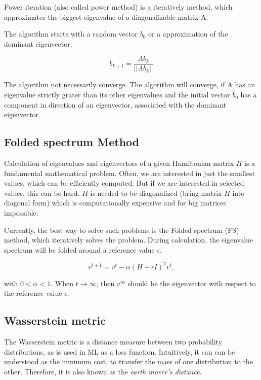 Power iteration (also called power method) is a iteratively method, 
which approximates the biggest eigenvalue of a diagonalizable matrix A.

The algorithm starts with a random vector $b_0$ or a approximation of the dominant eigenvector.

\begin{equation}
    \label{eq:powerIterations}
    b_{k+1} = \frac{Ab_k}{||Ab_k||}
\end{equation}

The algorithm not necessarily converge. The algorithm will converge, if A has an eigenvalue strictly grater than its other eigenvalues
and the initial vector $b_0$ has a component in direction of an eigenvector, associated with the dominant eigenvector.

\subsection{Folded spectrum Method}
\label{sec:FoldedSpectrumMethod}
Calculation of eigenvalues and eigenvectors of a given Hamiltonian matrix $H$ 
is a fundamental mathematical problem. Often, we are interested in just the smallest 
values, which can be efficiently computed. But if we are interested in selected values,
this can be hard. $H$ is needed to be diagonalized (bring matrix $H$ into diagonal form) 
which is computationally expensive and for big matrices impossible.

Currently, the best way to solve such problems is the Folded spectrum (FS) \cite{foldedSpectrumMethod} method,
which iteratively solves the problem. During calculation, the eigenvalue spectrum will be folded around a reference 
value $\epsilon$.

\begin{equation}
    \label{eq:foldedSpectrumMethod}
    v^{t+1} = v^t - \alpha (H - \epsilon I )^2 v^t ,
\end{equation}

with $0 < \alpha < 1$. When $t \rightarrow \infty$, then $v^{\infty}$ should be the 
eigenvector with respect to the reference value $\epsilon$.


\subsection{Wasserstein metric}

The Wasserstein metric is a distance measure between two probability distributions, as is used in ML as a loss function\cite{learningWithWasserstein}. 
Intuitively, it can can be understood as the minimum cost, to transfer the mass of one distribution to the other.
Therefore, it is also known as the \textit{earth mover's distance}.

